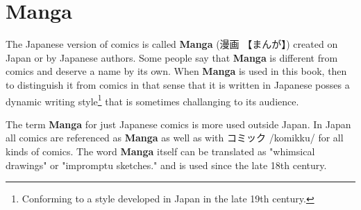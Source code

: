 \section{Manga} \label{sec:Manga}

The Japanese version of comics is called \textbf{Manga} ({漫画} {【まんが】})
created on Japan or by Japanese authors. Some people say that \textbf{Manga} is
different from comics and deserve a name by its own. When \textbf{Manga} is
used in this book, then to distinguish it from comics in that sense that it is
written in Japanese posses a dynamic writing style\footnote{Conforming to a
style developed in Japan in the late 19th century.}  that is sometimes
challanging to its audience.

The term \textbf{Manga} for just Japanese comics is more used outside Japan. In
Japan all comics are referenced as \textbf{Manga} as well as with {コミック}
/komikku/ for all kinds of comics. The word \textbf{Manga} itself can be
translated as "whimsical drawings" or "impromptu sketches." and is used since
the late 18th century.


